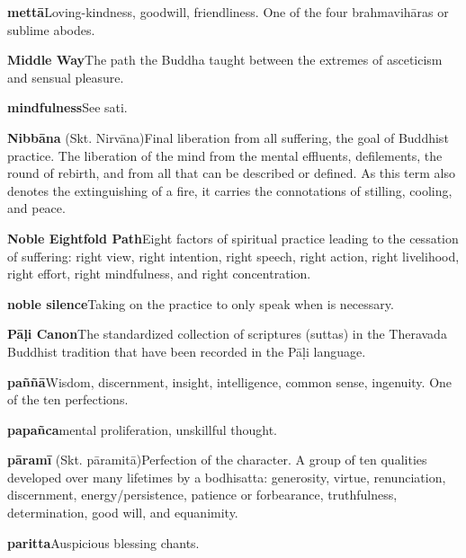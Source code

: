 {\textbf{mettā}\hspace{\glosskip}Loving-kindness, goodwill, friendliness. One of the 
four brahmavihāras or sublime abodes.

\textbf{Middle Way}\hspace{\glosskip}The path the Buddha taught between the extremes of 
asceticism and sensual pleasure.

\textbf{mindfulness}\hspace{\glosskip}See sati.

\textbf{Nibbāna} (Skt. Nirvāna)\hspace{\glosskip}Final liberation from all suffering, 
the goal of Buddhist practice. The liberation of the mind from the 
mental effluents, defilements, the round of rebirth, and from all that 
can be described or defined. As this term also denotes the 
extinguishing of a fire, it carries the connotations of stilling, 
cooling, and peace.

\textbf{Noble Eightfold Path}\hspace{\glosskip}Eight factors of spiritual practice 
leading to the cessation of suffering: right view, right intention, 
right speech, right action, right livelihood, right effort, right 
mindfulness, and right concentration.

\textbf{noble silence}\hspace{\glosskip}Taking on the practice to only speak when is 
necessary.

\textbf{Pāḷi Canon}\hspace{\glosskip}The standardized collection of scriptures 
(suttas) in the Theravada Buddhist tradition that have been recorded in 
the Pāḷi language.

\textbf{paññā}\hspace{\glosskip}Wisdom, discernment, insight, intelligence, common 
sense, ingenuity. One of the ten perfections.

\textbf{papañca}\hspace{\glosskip}mental proliferation, unskillful thought.

\textbf{pāramī} (Skt. pāramitā)\hspace{\glosskip}Perfection of the character. A 
group of ten qualities developed over many lifetimes by a bodhisatta: 
generosity, virtue, renunciation, discernment, energy/persistence, 
patience or forbearance, truthfulness, determination, good will, and 
equanimity.

\textbf{paritta}\hspace{\glosskip}Auspicious blessing chants.

}
